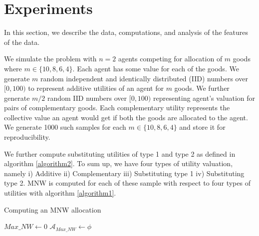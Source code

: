 
\section{Experiments}
\label{section_experiments}
In this section, we describe the data, computations, and analysis of the features of the data.

We simulate the problem with $n = 2$ agents competing for allocation of $m$ goods where $m \in \{10, 8, 6, 4\}$. Each agent has some value for each of the goods. We generate $m$ random independent and identically distributed (IID) numbers over $[0, 100)$ to represent additive utilities of an agent for $m$ goods. We further generate $m/2$ random IID numbers over $[0, 100)$ representing agent's valuation for pairs of complementary goods. Each complementary utility represents the collective value an agent would get if both the goods are allocated to the agent. We generate 1000 such samples for each $m \in \{10, 8, 6, 4\}$ and store it for reproducibility.

We further compute substituting utilities of type 1 and type 2 as defined in algorithm \ref{algorithm2}. To sum up, we have four types of utility valuation, namely i) Additive ii) Complementary iii) Substituting type 1 iv) Substituting type 2.  MNW is computed for each of these sample with respect to four types of utilities with algorithm \ref{algorithm1}.

\BlankLine

\begin{algorithm}
\label{algorithm1}
\caption{ Computing an MNW allocation }
\SetAlgoLined
{}
 $Max\_NW \leftarrow 0 $ \;
 $\mathcal{A}_{Max\_NW} \leftarrow \phi $ \;
\end{algorithm}

